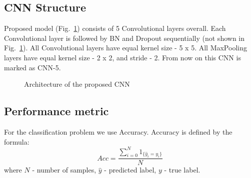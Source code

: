 \subsection{CNN Structure}
%

Proposed model (Fig.~\ref{ris:CNN_our}) consists of 5 Convolutional layers overall.
Each Convolutional layer is followed by BN and Dropout sequentially (not shown in Fig.~\ref{ris:CNN_our}).
All Convolutional layers have equal kernel size - 5 x 5.
All MaxPooling layers have equal kernel size - 2 x 2, and stride - 2.
From now on this CNN is marked as CNN-5.
\begin{figure}[ht]
	\caption{Architecture of the proposed CNN}
	\label{ris:CNN_our}
\end{figure}

\subsection{Performance metric}
For the classification problem we use Accuracy.
Accuracy is defined by the formula:
\begin{equation}
Acc = \frac{\sum_{i=0}^{N} 1_{\{\hat{y}_i=y_i\}}}{N}
\end{equation}
where $N$ - number of samples, $\hat{y}$ - predicted label, $y$ - true label.

